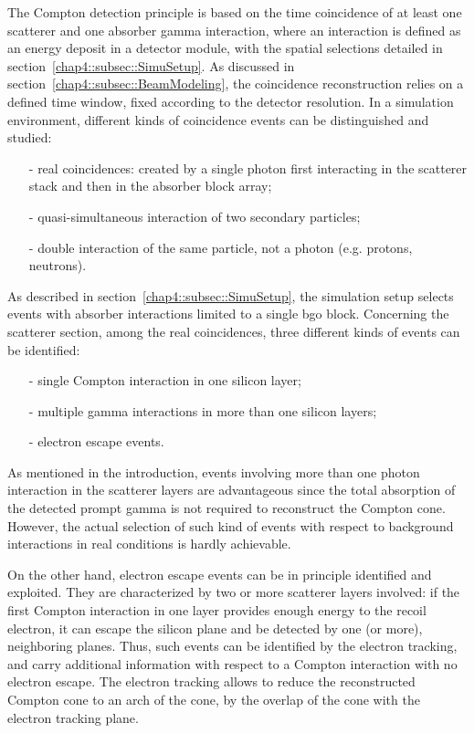 The Compton detection principle is based on the time coincidence of at least one scatterer and one absorber gamma interaction, where an interaction is defined as an energy deposit in a detector module, with the spatial selections detailed in section~\ref{chap4::subsec::SimuSetup}. As discussed in section~\ref{chap4::subsec::BeamModeling}, the coincidence reconstruction relies on a defined time window, fixed according to the detector resolution. In a simulation environment, different kinds of coincidence events can be distinguished and studied: 
\begin{itemize}
\item[-] real coincidences: created by a single photon first interacting in the scatterer stack and then in the absorber block array;
\item[-] quasi-simultaneous interaction of two secondary particles;
\item[-] double interaction of the same particle, not a photon (e.g. protons, neutrons).
\end{itemize}
As described in section~\ref{chap4::subsec::SimuSetup}, the simulation setup selects events with absorber interactions limited to a single \gls{bgo} block.
Concerning the scatterer section, among the real coincidences, three different kinds of events can be identified:
\begin{itemize}
\item[-] single Compton interaction in one silicon layer;
\item[-] multiple gamma interactions in more than one silicon layers;
\item[-] electron escape events.
\end{itemize}
As mentioned in the introduction, events involving more than one photon interaction in the scatterer layers are advantageous since the total absorption of the detected prompt gamma is not required to reconstruct the Compton cone. However, the actual selection of such kind of events with respect to background interactions in real conditions is hardly achievable.

On the other hand, electron escape events can be in principle identified and exploited. They are characterized by two or more scatterer layers involved: if the first Compton interaction in one layer provides enough energy to the recoil electron, it can escape the silicon plane and be detected by one (or more), neighboring planes. Thus, such events can be identified by the electron tracking, and carry additional information with respect to a Compton interaction with no electron escape. The electron tracking allows to reduce the reconstructed Compton cone to an arch of the cone, by the overlap of the cone with the electron tracking plane.      

